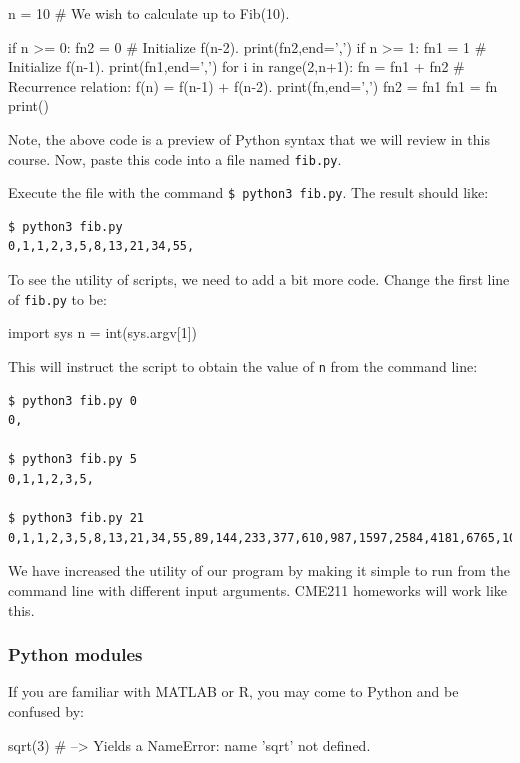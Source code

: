\documentclass[12pt,letterpaper,twoside]{article}
\begin{document}
\begin{python}
n = 10                  # We wish to calculate up to Fib(10).

if n >= 0:
    fn2 = 0             # Initialize f(n-2).
    print(fn2,end=',')
if n >= 1:
    fn1 = 1             # Initialize f(n-1).
    print(fn1,end=',')
for i in range(2,n+1):
    fn = fn1 + fn2      # Recurrence relation: f(n) = f(n-1) + f(n-2).
    print(fn,end=',')
    fn2 = fn1
    fn1 = fn
print()
\end{python}

Note, the above code is a preview of Python syntax that we will review
in this course. Now, paste this code into a file named \texttt{fib.py}.

Execute the file with the command \newline 
\texttt{\$\ python3\ fib.py}. The result should like:

\begin{lstlisting}[language=bash]
$ python3 fib.py
0,1,1,2,3,5,8,13,21,34,55,
\end{lstlisting}

To see the utility of scripts, we need to add a bit more code. Change
the first line of \texttt{fib.py} to be:

\begin{python}
import sys
n = int(sys.argv[1])
\end{python}

This will instruct the script to obtain the value of \texttt{n} from the
command line:

\begin{lstlisting}[language=bash]
$ python3 fib.py 0
0,

$ python3 fib.py 5
0,1,1,2,3,5,

$ python3 fib.py 21
0,1,1,2,3,5,8,13,21,34,55,89,144,233,377,610,987,1597,2584,4181,6765,10946,
\end{lstlisting}

We have increased the utility of our program by making it simple to run
from the command line with different input arguments. CME211 homeworks
will work like this.

\subsubsection{Python modules}
If you are familiar with MATLAB or R, you may come to Python and be confused
by:

\begin{python}
sqrt(3)  # --> Yields a NameError: name 'sqrt' not defined.
\end{python}
\end{document}
